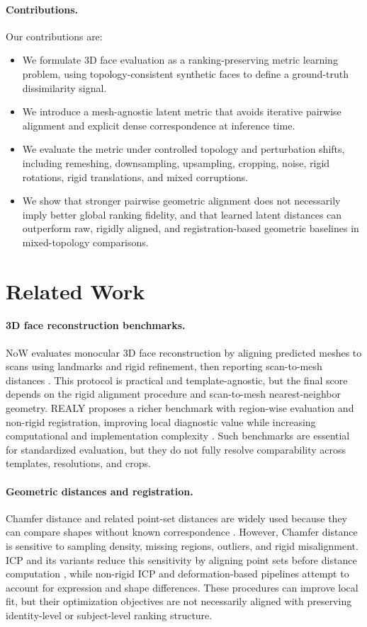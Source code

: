 \documentclass{article}
\begin{document}
\paragraph{Contributions.}
Our contributions are:
\begin{itemize}
    \item We formulate 3D face evaluation as a ranking-preserving metric learning problem, using topology-consistent synthetic faces to define a ground-truth dissimilarity signal.
    \item We introduce a mesh-agnostic latent metric that avoids iterative pairwise alignment and explicit dense correspondence at inference time.
    \item We evaluate the metric under controlled topology and perturbation shifts, including remeshing, downsampling, upsampling, cropping, noise, rigid rotations, rigid translations, and mixed corruptions.
    \item We show that stronger pairwise geometric alignment does not necessarily imply better global ranking fidelity, and that learned latent distances can outperform raw, rigidly aligned, and registration-based geometric baselines in mixed-topology comparisons.
\end{itemize}

\section{Related Work}

\paragraph{3D face reconstruction benchmarks.}
NoW evaluates monocular 3D face reconstruction by aligning predicted meshes to scans using landmarks and rigid refinement, then reporting scan-to-mesh distances \citep{now2018}. This protocol is practical and template-agnostic, but the final score depends on the rigid alignment procedure and scan-to-mesh nearest-neighbor geometry. REALY proposes a richer benchmark with region-wise evaluation and non-rigid registration, improving local diagnostic value while increasing computational and implementation complexity \citep{realy2022}. Such benchmarks are essential for standardized evaluation, but they do not fully resolve comparability across templates, resolutions, and crops.

\paragraph{Geometric distances and registration.}
Chamfer distance and related point-set distances are widely used because they can compare shapes without known correspondence \citep{fan2017pointset}. However, Chamfer distance is sensitive to sampling density, missing regions, outliers, and rigid misalignment. ICP and its variants reduce this sensitivity by aligning point sets before distance computation \citep{besl1992icp}, while non-rigid ICP and deformation-based pipelines attempt to account for expression and shape differences. These procedures can improve local fit, but their optimization objectives are not necessarily aligned with preserving identity-level or subject-level ranking structure.
\end{document}

